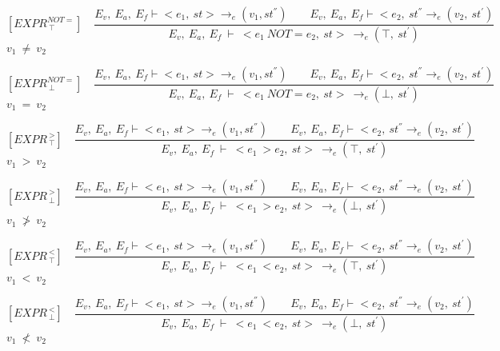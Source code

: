    	\[
   	[EXPR^{NOT=}_{\ \top}] \quad
   	\dfrac{E_v, \ E_a, \ E_f \vdash <e_1, \ st> \rightarrow_e (v_1, st^{''}) \qquad E_v, \ E_a, \ E_f \vdash <e_2, \ st^{''} \rightarrow_e (v_2, \ st^{'})}{E_v, \ E_a, \ E_f \ \vdash \ <e_1 \ NOT= e_2, \ st> \ \rightarrow_e (\top, \ st^{'})}
   	\]
	\begin{math}
   	v_1 \ \not= \ v_2
   	\end{math}   	
   	

   	\[
   	[EXPR^{NOT=}_{\ \bot}] \quad
   	\dfrac{E_v, \ E_a, \ E_f \vdash <e_1, \ st> \rightarrow_e (v_1, st^{''}) \qquad E_v, \ E_a, \ E_f \vdash <e_2, \ st^{''} \rightarrow_e (v_2, \ st^{'})}{E_v, \ E_a, \ E_f \ \vdash \ <e_1 \ NOT= e_2, \ st> \ \rightarrow_e (\bot, \ st^{'})}
   	\]
	\begin{math}
   	v_1 \ = \ v_2
   	\end{math}   	
   	
   	
   	\[
   	[EXPR^{\ >}_{\ \top}] \quad
   	\dfrac{E_v, \ E_a, \ E_f \vdash <e_1, \ st> \rightarrow_e (v_1, st^{''}) \qquad E_v, \ E_a, \ E_f \vdash <e_2, \ st^{''} \rightarrow_e (v_2, \ st^{'})}{E_v, \ E_a, \ E_f \ \vdash \ <e_1 \ > e_2, \ st> \ \rightarrow_e (\top, \ st^{'})}
   	\]
	\begin{math}
   	v_1 \ > \ v_2
   	\end{math}   	
   	
   	\newcommand{\exprtrans}[5][E_v, E_a,E_f]{#1\vdash \langle #2, #3 \rangle \mathrel{\to_e} (#4 , #5)}
   	
   	\[
   	[EXPR^{\ >}_{\ \bot}] \quad
   	\dfrac{E_v, \ E_a, \ E_f \vdash <e_1, \ st> \rightarrow_e (v_1, st^{''}) \qquad E_v, \ E_a, \ E_f \vdash <e_2, \ st^{''} \rightarrow_e (v_2, \ st^{'})}{E_v, \ E_a, \ E_f \ \vdash \ <e_1 \ > e_2, \ st> \ \rightarrow_e (\bot, \ st^{'})}
   	\]
	\begin{math}
   	v_1 \ \not> \ v_2
   	\end{math}   
   	
   	\[
   	[EXPR^{\ <}_{\ \top}] \quad
   	\dfrac{E_v, \ E_a, \ E_f \vdash <e_1, \ st> \rightarrow_e (v_1, st^{''}) \qquad E_v, \ E_a, \ E_f \vdash <e_2, \ st^{''} \rightarrow_e (v_2, \ st^{'})}{E_v, \ E_a, \ E_f \ \vdash \ <e_1 \ < e_2, \ st> \ \rightarrow_e (\top, \ st^{'})}
   	\]
	\begin{math}
   	v_1 \ < \ v_2
   	\end{math}   	
   	

   	\[
   	[EXPR^{\ <}_{\ \bot}] \quad
   	\dfrac{E_v, \ E_a, \ E_f \vdash <e_1, \ st> \rightarrow_e (v_1, st^{''}) \qquad E_v, \ E_a, \ E_f \vdash <e_2, \ st^{''} \rightarrow_e (v_2, \ st^{'})}{E_v, \ E_a, \ E_f \ \vdash \ <e_1 \ < e_2, \ st> \ \rightarrow_e (\bot, \ st^{'})}
   	\]
	\begin{math}
   	v_1 \ \not< \ v_2
   	\end{math}
   	
